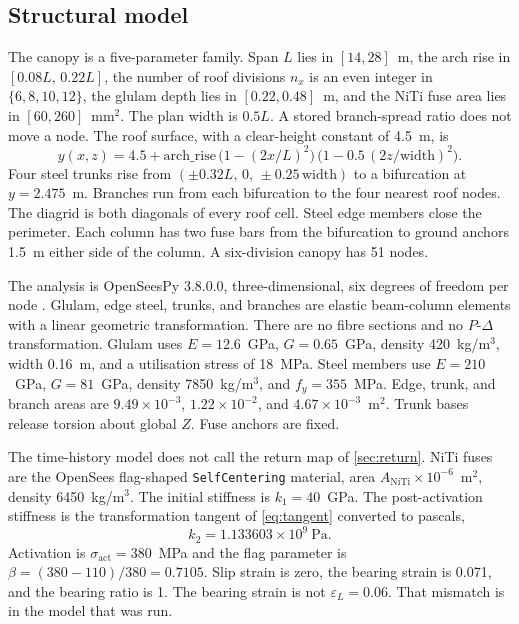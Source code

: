 \documentclass[10pt,a4paper]{article}
\begin{document}
\subsection{Structural model}
\label{sec:ideal}

The canopy is a five-parameter family. Span $L$ lies in $[14,28]$~m, the arch rise in $[0.08L,\,0.22L]$, the number of roof divisions $n_x$ is an even integer in $\{6,8,10,12\}$, the glulam depth lies in $[0.22,0.48]$~m, and the NiTi fuse area lies in $[60,260]$~mm$^2$. The plan width is $0.5L$. A stored branch-spread ratio does not move a node. The roof surface, with a clear-height constant of 4.5~m, is
\begin{equation}
  \label{eq:roof}
  y(x,z)=4.5+\mathrm{arch\_rise}\,
  \bigl(1-(2x/L)^2\bigr)\,
  \bigl(1-0.5\,(2z/\mathrm{width})^2\bigr).
\end{equation}
Four steel trunks rise from $(\pm 0.32L,\,0,\,\pm 0.25\,\mathrm{width})$ to a bifurcation at $y=2.475$~m. Branches run from each bifurcation to the four nearest roof nodes. The diagrid is both diagonals of every roof cell. Steel edge members close the perimeter. Each column has two fuse bars from the bifurcation to ground anchors 1.5~m either side of the column. A six-division canopy has 51 nodes.

The analysis is OpenSeesPy 3.8.0.0, three-dimensional, six degrees of freedom per node \cite{zhu2018,mckenna2011}. Glulam, edge steel, trunks, and branches are elastic beam-column elements with a linear geometric transformation. There are no fibre sections and no $P$-$\Delta$ transformation. Glulam uses $E=12.6$~GPa, $G=0.65$~GPa, density 420~kg/m$^3$, width 0.16~m, and a utilisation stress of 18~MPa. Steel members use $E=210$~GPa, $G=81$~GPa, density 7850~kg/m$^3$, and $f_y=355$~MPa. Edge, trunk, and branch areas are $9.49\times 10^{-3}$, $1.22\times 10^{-2}$, and $4.67\times 10^{-3}$~m$^2$. Trunk bases release torsion about global $Z$. Fuse anchors are fixed.

The time-history model does not call the return map of \cref{sec:return}. NiTi fuses are the OpenSees flag-shaped \texttt{SelfCentering} material, area $A_{\mathrm{NiTi}}\times 10^{-6}$~m$^2$, density 6450~kg/m$^3$. The initial stiffness is $k_1=40$~GPa. The post-activation stiffness is the transformation tangent of \eqref{eq:tangent} converted to pascals,
\begin{equation}
  k_2=1.133603\times 10^{9}~\mathrm{Pa}.
\end{equation}
Activation is $\sigma_{\mathrm{act}}=380$~MPa and the flag parameter is $\beta=(380-110)/380=0.7105$. Slip strain is zero, the bearing strain is 0.071, and the bearing ratio is 1. The bearing strain is not $\varepsilon_L=0.06$. That mismatch is in the model that was run.
\end{document}
